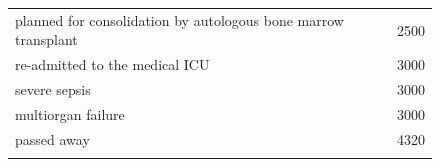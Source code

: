 \begin{figure}[!htbp]
\begin{minipage}[!htbp]{0.49\textwidth}
\begin{tabular}{P{0.75\textwidth}r}
            planned for consolidation by autologous bone marrow transplant & 2500 \\  
            re-admitted to the medical ICU  & 3000 \\  
            severe sepsis &	3000 \\
            multiorgan failure & 3000 \\
            passed away & 4320 \\
            & 
        \end{tabular}
    \end{minipage}
\end{figure} 

